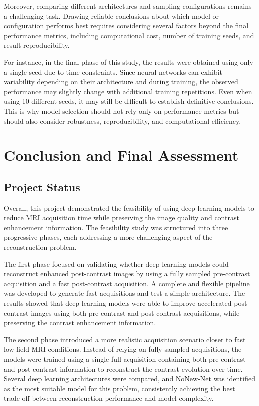 \documentclass[12pt]{article}
\begin{document}
Moreover, comparing different architectures and sampling configurations remains a challenging task. 
Drawing reliable conclusions about which model or configuration performs best requires considering several factors beyond the final performance metrics, including computational cost, number of training seeds, and result reproducibility.
\vspace{0.5cm}

For instance, in the final phase of this study, the results were obtained using only a single seed due to time constraints. 
Since neural networks can exhibit variability depending on their architecture and during training, the observed performance may slightly change with additional training repetitions.
Even when using 10 different seeds, it may still be difficult to establish definitive conclusions.
This is why model selection should not rely only on performance metrics but should also consider robustness, reproducibility, and computational efficiency.

\section{Conclusion and Final Assessment}

\subsection{Project Status}

Overall, this project demonstrated the feasibility of using deep learning models to reduce MRI acquisition time while preserving the image quality and contrast enhancement information. 
The feasibility study was structured into three progressive phases, each addressing a more challenging aspect of the reconstruction problem.
\vspace{0.5cm}

The first phase focused on validating whether deep learning models could reconstruct enhanced post-contrast images by using a fully sampled pre-contrast acquisition and a fast post-contrast acquisition.
A complete and flexible pipeline was developed to generate fast acquisitions and test a simple architecture.
The results showed that deep learning models were able to improve accelerated post-contrast images using both pre-contrast and post-contrast acquisitions, while preserving the contrast enhancement information.
\vspace{0.5cm}

The second phase introduced a more realistic acquisition scenario closer to fast low-field MRI conditions.
Instead of relying on fully sampled acquisitions, the models were trained using a single full acquisition containing both pre-contrast and post-contrast information to reconstruct the contrast evolution over time.
Several deep learning architectures were compared, and NoNew-Net was identified as the most suitable model for this problem, consistently achieving the best trade-off between reconstruction performance and model complexity.
\vspace{0.5cm}
\end{document}
